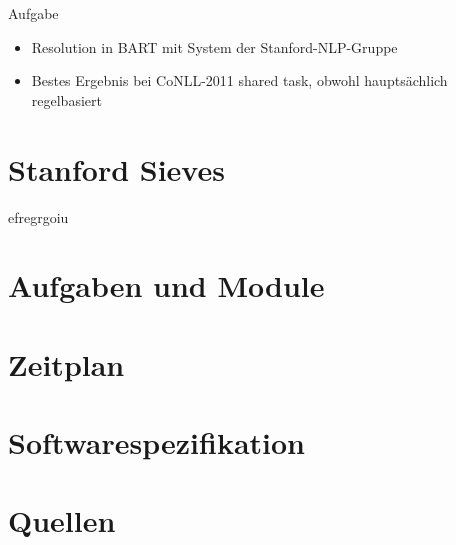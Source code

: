 \documentclass[11pt,a4paper]{beamer}
\begin{document}
\begin{frame}{Aufgabe}
\begin{itemize}
\item Resolution in BART mit System der Stanford-NLP-Gruppe
\item Bestes Ergebnis bei CoNLL-2011 shared task, obwohl haupts\"achlich regelbasiert
\end{itemize}
\end{frame}

\section{Stanford Sieves}
\begin{frame}
efregrgoiu
\end{frame}

\section{Aufgaben und Module}
\section{Zeitplan}
\section{Softwarespezifikation}
\section{Quellen}
\end{document}

